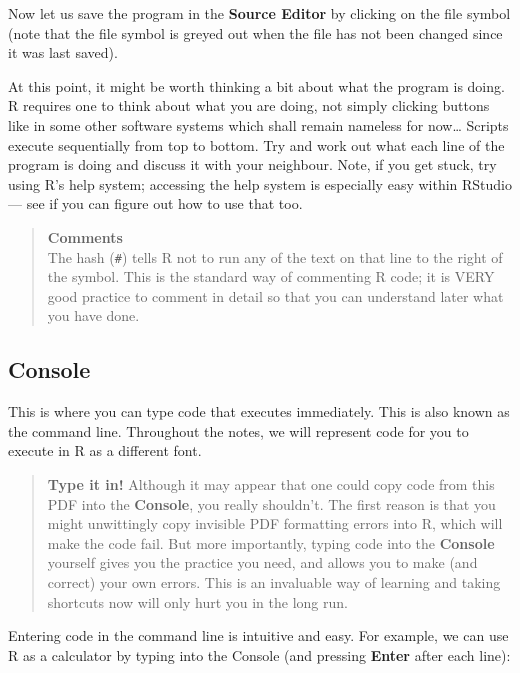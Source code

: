 \documentclass[]{book}
\theoremstyle{definition}
\theoremstyle{definition}
\theoremstyle{definition}
\theoremstyle{remark}
\begin{document}
Now let us save the program in the \textbf{Source Editor} by clicking on
the file symbol (note that the file symbol is greyed out when the file
has not been changed since it was last saved).

At this point, it might be worth thinking a bit about what the program
is doing. R requires one to think about what you are doing, not simply
clicking buttons like in some other software systems which shall remain
nameless for now\ldots{} Scripts execute sequentially from top to
bottom. Try and work out what each line of the program is doing and
discuss it with your neighbour. Note, if you get stuck, try using R's
help system; accessing the help system is especially easy within RStudio
--- see if you can figure out how to use that too.

\begin{quote}
\textbf{Comments}\\
The hash (\texttt{\#}) tells R not to run any of the text on that line
to the right of the symbol. This is the standard way of commenting R
code; it is VERY good practice to comment in detail so that you can
understand later what you have done.
\end{quote}

\subsection{Console}\label{console}

This is where you can type code that executes immediately. This is also
known as the command line. Throughout the notes, we will represent code
for you to execute in R as a different font.

\begin{quote}
\textbf{Type it in!} Although it may appear that one could copy code
from this PDF into the \textbf{Console}, you really shouldn't. The first
reason is that you might unwittingly copy invisible PDF formatting
errors into R, which will make the code fail. But more importantly,
typing code into the \textbf{Console} yourself gives you the practice
you need, and allows you to make (and correct) your own errors. This is
an invaluable way of learning and taking shortcuts now will only hurt
you in the long run.
\end{quote}

Entering code in the command line is intuitive and easy. For example, we
can use R as a calculator by typing into the Console (and pressing
\textbf{Enter} after each line):
\end{document}
